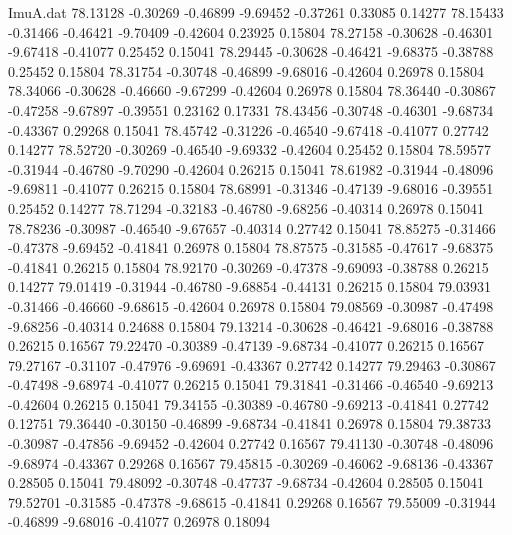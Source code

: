 \begin{filecontents}{ImuA.dat}
  78.13128   -0.30269   -0.46899   -9.69452   -0.37261    0.33085    0.14277
  78.15433   -0.31466   -0.46421   -9.70409   -0.42604    0.23925    0.15804
  78.27158   -0.30628   -0.46301   -9.67418   -0.41077    0.25452    0.15041
  78.29445   -0.30628   -0.46421   -9.68375   -0.38788    0.25452    0.15804
  78.31754   -0.30748   -0.46899   -9.68016   -0.42604    0.26978    0.15804
  78.34066   -0.30628   -0.46660   -9.67299   -0.42604    0.26978    0.15804
  78.36440   -0.30867   -0.47258   -9.67897   -0.39551    0.23162    0.17331
  78.43456   -0.30748   -0.46301   -9.68734   -0.43367    0.29268    0.15041
  78.45742   -0.31226   -0.46540   -9.67418   -0.41077    0.27742    0.14277
  78.52720   -0.30269   -0.46540   -9.69332   -0.42604    0.25452    0.15804
  78.59577   -0.31944   -0.46780   -9.70290   -0.42604    0.26215    0.15041
  78.61982   -0.31944   -0.48096   -9.69811   -0.41077    0.26215    0.15804
  78.68991   -0.31346   -0.47139   -9.68016   -0.39551    0.25452    0.14277
  78.71294   -0.32183   -0.46780   -9.68256   -0.40314    0.26978    0.15041
  78.78236   -0.30987   -0.46540   -9.67657   -0.40314    0.27742    0.15041
  78.85275   -0.31466   -0.47378   -9.69452   -0.41841    0.26978    0.15804
  78.87575   -0.31585   -0.47617   -9.68375   -0.41841    0.26215    0.15804
  78.92170   -0.30269   -0.47378   -9.69093   -0.38788    0.26215    0.14277
  79.01419   -0.31944   -0.46780   -9.68854   -0.44131    0.26215    0.15804
  79.03931   -0.31466   -0.46660   -9.68615   -0.42604    0.26978    0.15804
  79.08569   -0.30987   -0.47498   -9.68256   -0.40314    0.24688    0.15804
  79.13214   -0.30628   -0.46421   -9.68016   -0.38788    0.26215    0.16567
  79.22470   -0.30389   -0.47139   -9.68734   -0.41077    0.26215    0.16567
  79.27167   -0.31107   -0.47976   -9.69691   -0.43367    0.27742    0.14277
  79.29463   -0.30867   -0.47498   -9.68974   -0.41077    0.26215    0.15041
  79.31841   -0.31466   -0.46540   -9.69213   -0.42604    0.26215    0.15041
  79.34155   -0.30389   -0.46780   -9.69213   -0.41841    0.27742    0.12751
  79.36440   -0.30150   -0.46899   -9.68734   -0.41841    0.26978    0.15804
  79.38733   -0.30987   -0.47856   -9.69452   -0.42604    0.27742    0.16567
  79.41130   -0.30748   -0.48096   -9.68974   -0.43367    0.29268    0.16567
  79.45815   -0.30269   -0.46062   -9.68136   -0.43367    0.28505    0.15041
  79.48092   -0.30748   -0.47737   -9.68734   -0.42604    0.28505    0.15041
  79.52701   -0.31585   -0.47378   -9.68615   -0.41841    0.29268    0.16567
  79.55009   -0.31944   -0.46899   -9.68016   -0.41077    0.26978    0.18094

\end{filecontents}
